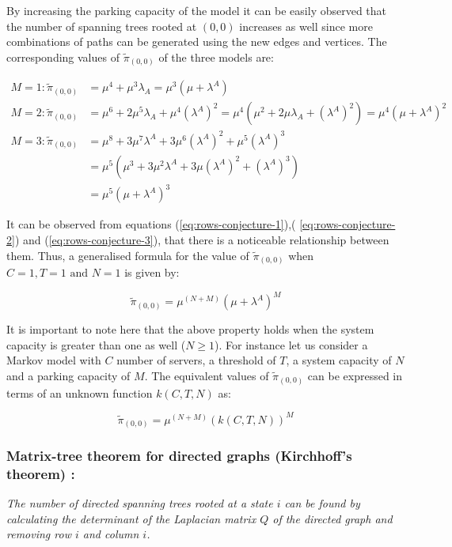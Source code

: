By increasing the parking capacity of the model it can be easily observed that the number of spanning trees rooted at \((0,0)\) increases as well since more combinations of paths can be generated using the new edges and vertices. The corresponding values of \(\tilde{\pi}_{(0,0)}\) of the three models are:

\begin{align}
    M = 1: \tilde{\pi}_{(0,0)} &= \mu^4 + \mu^3 \lambda_A = \mu^3 (\mu + \lambda^A) \label{eq:rows-conjecture-1}\\
    M = 2: \tilde{\pi}_{(0,0)} &= \mu^6 + 2\mu^5 \lambda_A + \mu^4 (\lambda^A)^2 = \mu^4(\mu^2 + 2\mu \lambda_A + (\lambda^A)^2) = \mu^4 (\mu + \lambda^A) ^ 2 \label{eq:rows-conjecture-2}\\
    M = 3: \tilde{\pi}_{(0,0)} &= \mu^8 + 3 \mu^7 \lambda^A + 3 \mu^6 (\lambda^A)^2 + \mu^5(\lambda^A)^3 \nonumber \\
    &= \mu^5 (\mu^3 + 3 \mu ^2 \lambda^A + 3 \mu (\lambda^A)^2 + (\lambda^A)^3) \nonumber \\
    &= \mu^5 (\mu + \lambda^A) ^ 3 \label{eq:rows-conjecture-3}
\end{align}

It can be observed from equations (\ref{eq:rows-conjecture-1}),( \ref{eq:rows-conjecture-2}) and (\ref{eq:rows-conjecture-3}), that there is a noticeable relationship between them. Thus, a generalised formula for the value of \(\tilde{\pi}_{(0,0)}\) when \(C=1, T=1 \text{ and } N=1\) is given by:

\begin{equation}\label{eq:rows-conjecture-general}
    \tilde{\pi}_{(0,0)} = \mu^{(N+M)} (\mu + \lambda^A)^M
\end{equation}

It is important to note here that the above property holds when the system capacity is greater than one as well (\(N \geq 1\)). For instance let us consider a Markov model with \(C\) number of servers, a threshold of \(T\), a system capacity of \(N\) and a parking capacity of \(M\). The equivalent values of \(\tilde{\pi}_{(0,0)}\) can be expressed in terms of an unknown function \(k(C,T,N)\) as:

\begin{equation}
    \tilde{\pi}_{(0,0)} = \mu^{(N+M)} (k(C,T,N))^M
\end{equation}


\subsubsection{Matrix-tree theorem for directed graphs (Kirchhoff's theorem) \cite{matrix-tree-theorem}: }
\textit{The number of directed spanning trees rooted at a state \(i\) can be found by calculating the determinant of the Laplacian matrix \(Q\) of the directed graph and removing row \(i\) and column \(i\).}


